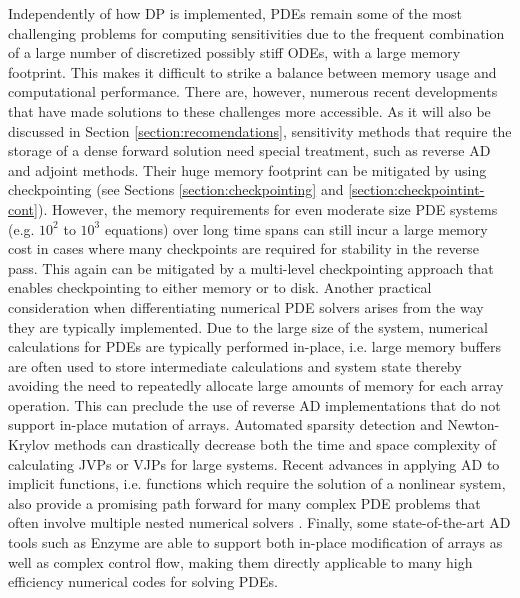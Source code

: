 Independently of how DP is implemented, PDEs remain some of the most challenging problems for computing sensitivities due to the frequent combination of a large number of discretized possibly stiff ODEs, with a large memory footprint. 
This makes it difficult to strike a balance between memory usage and computational performance. 
There are, however, numerous recent developments that have made solutions to these challenges more accessible. 
As it will also be discussed in Section \ref{section:recomendations}, sensitivity methods that require the storage of a dense forward solution need special treatment, such as reverse AD and adjoint methods. 
Their huge memory footprint can be mitigated by using checkpointing (see Sections \ref{section:checkpointing} and \ref{section:checkpointint-cont}).
However, the memory requirements for even moderate size PDE systems (e.g. $10^2$ to $10^3$ equations) over long time spans can still incur a large memory cost in cases where many checkpoints are required for stability in the reverse pass. 
This again can be mitigated by a multi-level checkpointing approach that enables checkpointing to either memory or to disk.
Another practical consideration when differentiating numerical PDE solvers arises from the way they are typically implemented. 
Due to the large size of the system, numerical calculations for PDEs are typically performed in-place, i.e. large memory buffers are often used to store intermediate calculations and system state thereby avoiding the need to repeatedly allocate large amounts of memory for each array operation. 
This can preclude the use of reverse AD implementations that do not support in-place mutation of arrays.
Automated sparsity detection \cite{gowdaSparsityProgrammingAutomated2019} and Newton-Krylov methods \cite{knollJacobianfreeNewtonKrylov2004,montoisonKrylovJlJulia2023} can drastically decrease both the time and space complexity of calculating JVPs or VJPs for large systems. 
Recent advances in applying AD to implicit functions, i.e. functions which require the solution of a nonlinear system, also provide a promising path forward for many complex PDE problems that often involve multiple nested numerical solvers \cite{blondelEfficientModularImplicit2022a}. 
Finally, some state-of-the-art AD tools such as Enzyme \cite{moses_Enzyme} are able to support both in-place modification of arrays as well as complex control flow, making them directly applicable to many high efficiency numerical codes for solving PDEs.



